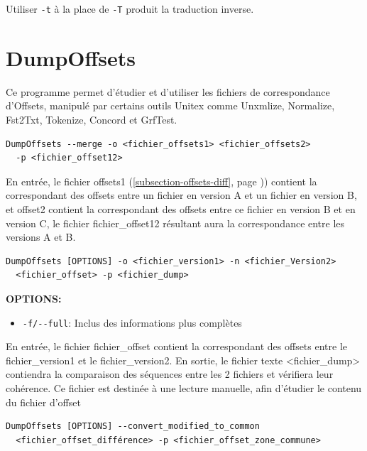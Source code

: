 \noindent Utiliser \verb+-t+ à la place de \verb+-T+ produit la traduction inverse.	 






\section{DumpOffsets}
\label{section-DumpOffsets}

\noindent Ce programme permet d'étudier et d'utiliser les fichiers de correspondance d'Offsets, manipulé par
certains outils Unitex comme Unxmlize, Normalize, Fst2Txt, Tokenize, Concord et GrfTest.

\bigskip
\begin{verbatim}
DumpOffsets --merge -o <fichier_offsets1> <fichier_offsets2>
  -p <fichier_offset12>
\end{verbatim}
En entrée, le fichier offsets1 (\ref{subsection-offsets-diff}, page \pageref{subsection-offsets-diff})) contient la correspondant des offsets entre un fichier en version A
et un fichier en version B, et offset2 contient la correspondant des offsets entre ce fichier en version B
et en version C, le fichier fichier\_offset12 résultant aura la correspondance entre les versions A et B.

\begin{verbatim}
DumpOffsets [OPTIONS] -o <fichier_version1> -n <fichier_Version2>
  <fichier_offset> -p <fichier_dump>
\end{verbatim}
\bigskip

\noindent \textbf{OPTIONS:}
\begin{itemize}
\item \verb+-f/--full+: Inclus des informations plus complètes
\end{itemize}

En entrée, le fichier fichier\_offset contient la correspondant des offsets entre le fichier\_version1 et le
fichier\_version2. En sortie, le fichier texte <fichier\_dump> contiendra la comparaison des séquences entre les
2 fichiers et vérifiera leur cohérence. Ce fichier est destinée à une lecture manuelle, afin d'étudier le contenu
du fichier d'offset


\bigskip
\begin{verbatim}
DumpOffsets [OPTIONS] --convert_modified_to_common 
  <fichier_offset_différence> -p <fichier_offset_zone_commune>
\end{verbatim}
\bigskip

